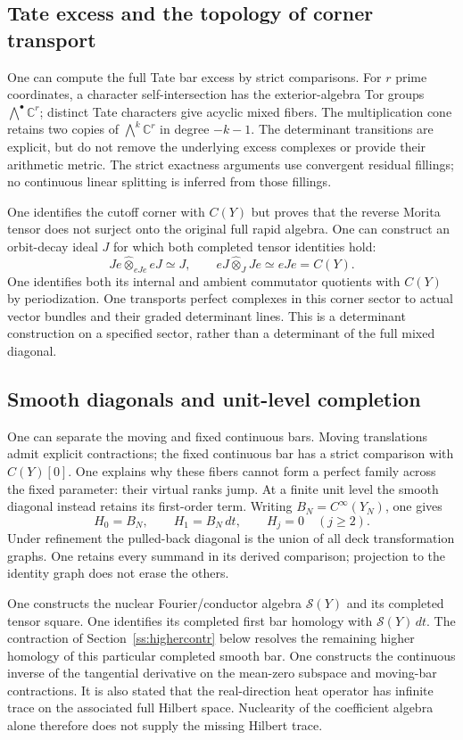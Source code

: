 \documentclass[11pt]{amsart}
\theoremstyle{definition}
\theoremstyle{remark}
\begin{document}
\subsection{Tate excess and the topology of corner transport}
One can compute the full Tate bar excess by strict comparisons.
For $r$ prime coordinates, a character self-intersection has the
exterior-algebra Tor groups $\bigwedge^\bullet\mathbb C^r$; distinct
Tate characters give acyclic mixed fibers. The multiplication cone
retains two copies of $\bigwedge^k\mathbb C^r$ in degree $-k-1$.
The determinant transitions are explicit, but do not remove the
underlying excess complexes or provide their arithmetic metric.
The strict exactness arguments use convergent residual fillings;
no continuous linear splitting is inferred from those fillings.

One identifies the cutoff corner with $C(Y)$ but proves that the
reverse Morita tensor does not surject onto the original full rapid
algebra. One can construct an orbit-decay ideal $J$ for which
both completed tensor identities hold:
\[
 Je\widehat\otimes_{eJe}eJ\simeq J,
 \qquad eJ\widehat\otimes_J Je\simeq eJe=C(Y).
\]
One identifies both its internal and ambient commutator quotients
with $C(Y)$ by periodization. One transports perfect complexes in
this corner sector to actual vector bundles and their graded determinant
lines. This is a determinant construction on a specified sector, rather
than a determinant of the full mixed diagonal.

\subsection{Smooth diagonals and unit-level completion}
One can separate the moving and fixed continuous bars. Moving
translations admit explicit contractions; the fixed continuous bar has
a strict comparison with $C(Y)[0]$. One explains why these fibers
cannot form a perfect family across the fixed parameter: their virtual
ranks jump. At a finite unit level the smooth diagonal instead retains
its first-order term. Writing $B_N=C^\infty(Y_N)$, one gives
\[
 H_0=B_N,\qquad H_1=B_N\,dt,\qquad H_j=0\quad(j\geq2).
\]
Under refinement the pulled-back diagonal is the union of all deck
transformation graphs. One retains every summand in its derived
comparison; projection to the identity graph does not erase the others.

One constructs the nuclear Fourier/conductor algebra
$\mathcal S(Y)$ and its completed tensor square. One identifies
its completed first bar homology with $\mathcal S(Y)\,dt$.
The contraction of Section~\ref{ss:highercontr} below resolves the remaining higher homology
of this particular completed smooth bar.
One constructs the continuous inverse of the tangential derivative
on the mean-zero subspace and moving-bar contractions. It is also stated
that the real-direction heat operator has infinite trace on the
associated full Hilbert space. Nuclearity of the coefficient algebra
alone therefore does not supply the missing Hilbert trace.
\end{document}

